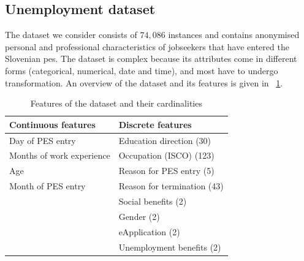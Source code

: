 \documentclass[3p,review,authoryear]{elsarticle}
\begin{document}
\begin{table}[h!]
\centering
\caption{Main properties of the datasets. Censoring shows the percentage of censored observations.}
\label{table:dataset}
\end{table}%



\subsection{Unemployment dataset}
The dataset we consider consists of $74,086$ instances and contains anonymised personal and professional characteristics of jobseekers that have entered the Slovenian \gls{pes}.
The dataset is complex because its attributes come in different forms (categorical, numerical, date and time), and most have to undergo transformation.
An overview of the dataset and its features is given in \tablename~\ref{table:dataset}.

\begin{table}[h!]
\centering
\caption{Features of the dataset and their cardinalities \citep{Andonovikj_2024}}
\begin{tabular}{ll}
\toprule
Continuous features& Discrete features\\
\midrule
Day of PES entry&Education direction (30)\\
Months of work experience&Occupation (ISCO) (123)\\
Age&Reason for PES entry (5)\\
Month of PES entry&Reason for termination (43)\\
&Social benefits (2)\\
&Gender (2)\\
&eApplication (2)\\
&Unemployment benefits (2)\\
\bottomrule
\end{tabular}
\label{table:dataset}
\end{table}%
\end{document}
